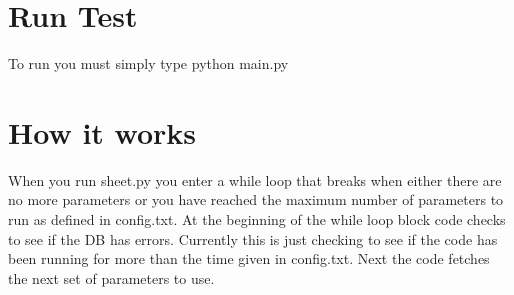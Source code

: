 \documentclass[12pt]{article}
\begin{document}
\section{Run Test}
To run you must simply type python main.py

\section{How it works}
When you run sheet.py you enter a while loop that breaks when either there are no more parameters or you have reached the maximum number of parameters to run as defined in config.txt.  At the beginning of the while loop block code checks to see if the DB has errors.  Currently this is just checking to see if the code has been running for more than the time given in config.txt.  Next the code fetches the next set of parameters to use.  
\end{document}
